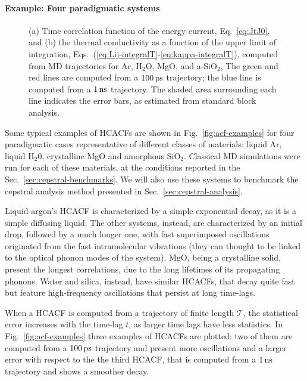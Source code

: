 \begin{LEtext}
\paragraph{Example: Four paradigmatic systems}
\begin{figure}[!tb]
    \begin{center}
        \subfigure[\label{fig:acf-examples}]{****************ESEMPI ARGON - ACQUA - SILICA - MGO ***********} %
        \subfigure[\label{fig:kappa-examples}]{****************ESEMPI ARGON - ACQUA - SILICA - MGO ***********} %
    \end{center}
	\caption{(a) Time correlation function of the energy current, Eq.~\eqref{eq:JtJ0}, and (b) the thermal conductivity as a function of the upper limit of integration, Eqs.~(\ref{eq:Lij-integralT}-\ref{eq:kappa-integralT}), computed from MD trajectories for Ar, H$_2$O, MgO, and a-SiO$_2$,
	The green and red lines are computed from a $100\,\mathrm{ps}$ trajectory; the blue line is computed from a $1\,\mathrm{ns}$ trajectory.
	The shaded area surrounding each line indicates the error bars, as estimated from standard block analysis.} 
\end{figure}
Some typical examples of HCACFs are shown in Fig.~\ref{fig:acf-examples} for four paradigmatic cases representative of different classes of materials: liquid Ar, liquid H$_2$0, crystalline MgO and amorphous SiO$_2$. Classical MD simulations were run for each of these materials, at the conditions reported in the Sec.~\ref{sec:cepstral-benchmarks}. 
We will also use these systems to benchmark the cepstral analysis method presented in Sec.~\ref{sec:cepstral-analysis}. 

Liquid argon's HCACF is characterized by a simple exponential decay, as it is a simple diffusing liquid. The other systems, instead, are characterized by an initial drop, followed by a much longer one, with fast superimposed oscillations originated from the fast intramolecular vibrations (they can thought to be linked to the optical phonon modes of the system). MgO, being a crystalline solid, present the longest correlations, due to the long lifetimes of its propagating phonons. Water and silica, instead, have similar HCACFs, that decay quite fast but feature high-frequency oscillations that persist at long time-lags.

When a HCACF is computed from a trajectory of finite length $\mathcal{T}$, the statistical error increases with the time-lag $t$, as larger time lags have less statistics. In Fig.~\ref{fig:acf-examples} three examples of HCACFs are plotted: two of them are computed from a $100\,\mathrm{ps}$ trajectory and present more oscillations and a larger error with respect to the the third HCACF, that is computed from a $1\,\mathrm{ns}$ trajectory and shows a smoother decay.



\end{LEtext}
